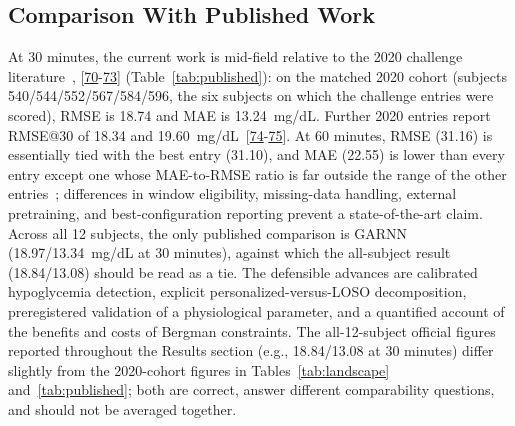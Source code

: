\documentclass[journal]{IEEEtran}
\begin{document}
\subsection{Comparison With Published Work}

At 30 minutes, the current work is mid-field relative to the 2020 challenge literature~\cite{ref64}, [\hyperref[ref60label]{70}-\hyperref[ref63label]{73}] (Table~\ref{tab:published}): on the matched 2020 cohort (subjects 540/544/552/567/584/596, the six subjects on which the challenge entries were scored), RMSE is 18.74 and MAE is 13.24~mg/dL. Further 2020 entries report RMSE@30 of 18.34 and 19.60~mg/dL~[\hyperref[ref65label]{74}-\hyperref[ref70label]{75}]. At 60 minutes, RMSE (31.16) is essentially tied with the best entry (31.10), and MAE (22.55) is lower than every entry except one whose MAE-to-RMSE ratio is far outside the range of the other entries~\cite{ref60}; differences in window eligibility, missing-data handling, external pretraining, and best-configuration reporting prevent a state-of-the-art claim. Across all 12 subjects, the only published comparison is GARNN~\cite{ref75} (18.97/13.34~mg/dL at 30 minutes), against which the all-subject result (18.84/13.08) should be read as a tie. The defensible advances are calibrated hypoglycemia detection, explicit personalized-versus-LOSO decomposition, preregistered validation of a physiological parameter, and a quantified account of the benefits and costs of Bergman constraints. The all-12-subject official figures reported throughout the Results section (e.g., 18.84/13.08 at 30 minutes) differ slightly from the 2020-cohort figures in Tables~\ref{tab:landscape} and~\ref{tab:published}; both are correct, answer different comparability questions, and should not be averaged together.
\end{document}
